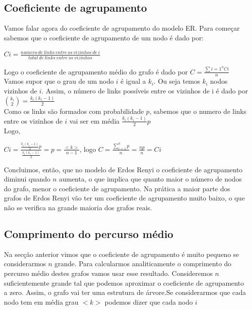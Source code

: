 \documentclass[conference, twocolumn]{IEEEtran}
\theoremstyle{plain}
\theoremstyle{definition}
\theoremstyle{remark}
\begin{document}
\subsection{Coeficiente de agrupamento}
Vamos falar agora do coeficiente de agrupamento do modelo ER.
Para começar sabemos que o coeficiente de agrupamento de um nodo é dado por:
\begin{center}
$Ci = \frac{numero\ de\ links\ entre\ os\ vizinhos\ de\ i}{total\ de\ links\ entre\ os\ vizinhos}$
\end{center}
Logo o coeficiente de agrupamento médio do grafo é dado por $C= \frac{\sum{i=1}^{n} Ci}{n}$\\
Vamos supor que o grau de um nodo $i$ é igual a $k_i$. Ou seja temos $k_i$ nodos vizinhos de $i$. Assim, o número de links possíveis entre os vizinhos de i é dado por $\binom{k_i}{2} = \frac{k_i(k_i-1)}{2}$\\

Como os links são formados com probabilidade $p$, sabemos que o numero de links entre os vizinhos de $i$ vai ser em média $\frac{k_i(k_i-1)}{2}p$\\

Logo,\\
\begin{center}
$Ci = \frac{\frac{k_i(k_i-1)}{2}p}{\frac{k_i(k_i-1)}{2}} = p = \frac{<k>}{n-1}$, logo $C=\frac{\sum_{i=1}^{n} p}{n} = \frac{np}{n} = Ci$
\end{center}

Concluimos, então, que no modelo de Erdos Renyi o coeficiente de agrupamento diminui quando $n$ aumenta, o que implica que quanto maior o número de nodos do grafo, menor o coeficiente de agrupamento. Na prática a maior parte dos grafos de Erdos Renyi vão ter um coeficiente de agrupamento muito baixo, o que não se verifica na grande maioria dos grafos reais.

\subsection{Comprimento do percurso médio}
Na secção anterior vimos que o coeficiente de agrupamento é muito pequeno se considerarmos $n$ grande. Para calcularmos analiticamente o comprimento do percurso médio destes grafos vamos usar esse resultado. Consideremos $n$ suficientemente grande tal que podemos aproximar o coeficiente de agrupamento a zero. Assim, o grafo vai ter uma estrutura de árvore.Se considerarmos que cada nodo tem em média grau $<k>$ podemos dizer que cada nodo $i$
\end{document}
